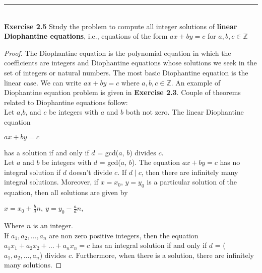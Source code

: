 \documentclass[a4paper]{article}
\begin{document}
\noindent\rule{12cm}{0.4pt}\\
\noindent \textbf{Exercise 2.5} Study the problem to compute all integer solutions of \textbf{linear Diophantine equations}, i.e., equations of the form $ax + by = c$ for $a, b, c \in \mathbb{Z}$
\begin{proof}
The Diophantine equation is the polynomial equation in which the coefficients are integers and Diophantine equations whose solutions we seek in the set of integers or natural numbers. The most basic Diophantine equation is the linear case. We can write $ax + by = c$ where $a, b, c \in \mathbb{Z}$. An example of Diophantine equation problem is given in \textbf{Exercise 2.3}. Couple of theorems related to Diophantine equations follow: \\
Let $a$,$b$, and $c$ be integers with $a$ and $b$ both not zero. The linear Diophantine equation
\begin{center}
$ax + by = c$
\end{center}
has a solution if and only if $d$ = gcd($a$, $b$) divides $c$.\\
Let $a$ and $b$ be integers with $d$ = gcd($a$, $b$). The equation $ax + by = c$ has no integral solution if $d$ doesn’t divide $c$. If $d \mid c$, then there are infinitely many integral solutions. Moreover, if $x = x_0$, $y = y_0$ is a particular solution of the equation, then all solutions are given by 
\begin{center}
$x = x_0 + \frac{b}{d}n,\ y=y_0 - \frac{a}{d}n,$
\end{center}
Where $n$ is an integer.\\
If $a_1, a_2,..., a_n$ are non zero positive integers, then the equation $a_1x_1 + a_2x_2 +...+ a_nx_n = c$ has an integral solution if and only if $d$ = ($a_1, a_2,..., a_n$) divides $c$. Furthermore, when there is a solution, there are infinitely many solutions.
\end{proof}
\end{document}
